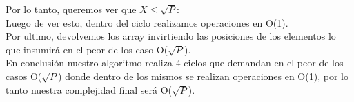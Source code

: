 Por lo tanto, queremos ver que $X \leq \sqrt{P}$:\\



Luego de ver esto, dentro del ciclo realizamos operaciones en O(1).\\
Por ultimo, devolvemos los array invirtiendo las posiciones de los elementos lo que insumir\'a en el peor de los caso O($\sqrt{P}$).\\

En conclusi\'on nuestro algoritmo realiza 4 ciclos que demandan en el peor de los casos O($\sqrt{P}$) donde dentro de los mismos se realizan operaciones en O(1), por lo tanto nuestra complejidad final ser\'a
O($\sqrt{P}$).




